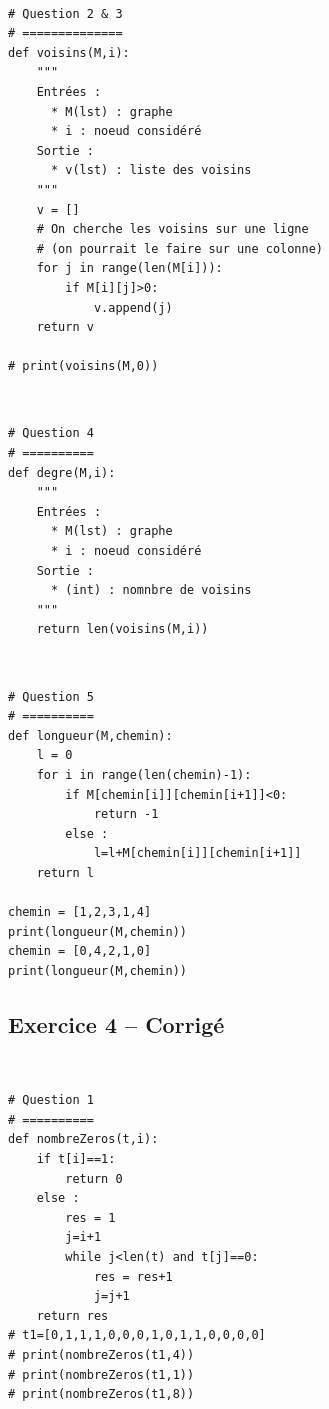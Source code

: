 \documentclass[10pt,fleqn]{article} %
\begin{document}
\begin{corrige}
$\quad$
\begin{lstlisting}
# Question 2 & 3
# ==============
def voisins(M,i):
    """
    Entrées : 
      * M(lst) : graphe
      * i : noeud considéré
    Sortie :
      * v(lst) : liste des voisins
    """
    v = []
    # On cherche les voisins sur une ligne 
    # (on pourrait le faire sur une colonne)
    for j in range(len(M[i])):
        if M[i][j]>0:
            v.append(j)
    return v
    
# print(voisins(M,0))
\end{lstlisting}
\end{corrige}


\begin{corrige}
$\quad$
\begin{lstlisting}
# Question 4
# ==========
def degre(M,i):
    """
    Entrées : 
      * M(lst) : graphe
      * i : noeud considéré
    Sortie :
      * (int) : nomnbre de voisins
    """
    return len(voisins(M,i))
\end{lstlisting}
\end{corrige}

\begin{corrige}
$\quad$
\begin{lstlisting}
# Question 5
# ==========
def longueur(M,chemin):
    l = 0
    for i in range(len(chemin)-1):
        if M[chemin[i]][chemin[i+1]]<0:
            return -1
        else :
            l=l+M[chemin[i]][chemin[i+1]]
    return l
    
chemin = [1,2,3,1,4]
print(longueur(M,chemin))        
chemin = [0,4,2,1,0]
print(longueur(M,chemin))
\end{lstlisting}
\end{corrige}

\vfill

\subsection*{Exercice 4 -- Corrigé}
\begin{corrige}
$\quad$
\begin{lstlisting}
# Question 1 
# ==========
def nombreZeros(t,i):
    if t[i]==1:
        return 0
    else : 
        res = 1
        j=i+1
        while j<len(t) and t[j]==0:
            res = res+1
            j=j+1
    return res
# t1=[0,1,1,1,0,0,0,1,0,1,1,0,0,0,0]
# print(nombreZeros(t1,4))
# print(nombreZeros(t1,1))
# print(nombreZeros(t1,8))
\end{lstlisting}
\end{corrige}
\end{document}
